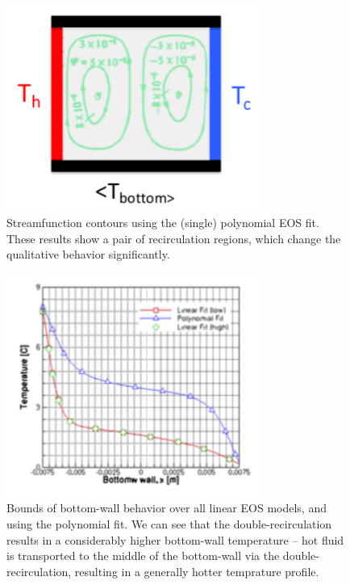 \documentclass[../primer.tex]{subfiles}
\begin{document}
\begin{figure}[!ht]
  \includegraphics[width=0.75\textwidth]{./images/cavity_double}
  \caption{Streamfunction contours using the (single) polynomial EOS fit. These
    results show a pair of recirculation regions, which change the qualitative
    behavior significantly.}
  \label{fig:cavity-double}
\end{figure}

\begin{figure}[!ht]
  \includegraphics[width=0.75\textwidth]{./images/bot_wall_double}
  \caption{Bounds of bottom-wall behavior over all linear EOS models, and using
    the polynomial fit. We can see that the double-recirculation results in a
    considerably higher bottom-wall temperature -- hot fluid is transported to
    the middle of the bottom-wall via the double-recirculation, resulting in a
    generally hotter temprature profile.}
  \label{fig:bot-wall-double}
\end{figure}
\end{document}
